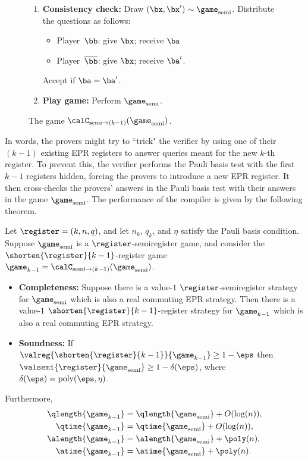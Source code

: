 {\begin{figure}
\begin{enumerate}
	\item \textbf{Consistency check:} Draw $(\bx, \bx') \sim \game_{\mathrm{semi}}$.
			Distribute the questions as follows:
				\begin{itemize}
				\item[$\circ$] Player~$\bb$: give $\bx$; receive $\ba$
				\item[$\circ$] Player~$\overline{\bb}$: give $\bx$; receive $\ba'$.
				\end{itemize}
				Accept if $\ba = \ba'$.
	\item \textbf{Play game:} Perform $\game_{\mathrm{semi}}$.
	\end{enumerate}
	\caption{The game $\calC_{\mathrm{semi} \rightarrow (k-1)}(\game_{\mathrm{semi}})$.\label{fig:one-to-zero}}
\end{figure}
}

In words, the provers might try to ``trick" the verifier by using one of their $(k-1)$ existing EPR registers to answer queries meant for the new $k$-th register.
To prevent this, the verifier performs the Pauli basis test with the first $k-1$ registers hidden, forcing the provers to introduce a new EPR register.
It then cross-checks the provers' answers in the Pauli basis test with their answers in the game $\game_{\mathrm{semi}}$.
The performance of the compiler is given by the following theorem.

\begin{theorem}\label{theorem:one-to-zero-compiler}
Let $\register = (k, n, q)$, and let $n_k$, $q_k$, and $\eta$ satisfy the Pauli basis condition.
Suppose $\game_{\mathrm{semi}}$ is a $\register$-semiregister game,
and consider the $\shorten{\register}{k-1}$-register game $\game_{k-1} = \calC_{\mathrm{semi} \rightarrow (k-1)}(\game_{\mathrm{semi}})$.
\begin{itemize}
\item[$\circ$] \textbf{Completeness:} Suppose there is a value-$1$ $\register$-semiregister strategy for $\game_{\mathrm{semi}}$ which is also a real commuting EPR strategy.
	Then there is a value-$1$ $\shorten{\register}{k-1}$-register strategy for $\game_{k-1}$ which is also a real commuting EPR strategy.
\item[$\circ$] \textbf{Soundness:} If $\valreg{\shorten{\register}{k-1}}{\game_{k-1}}\geq 1-\eps$ then $\valsemi{\register}{\game_{\mathrm{semi}}} \geq 1 -\delta(\eps)$, where $\delta(\eps) = \mathrm{poly}(\eps, \eta)$.
\end{itemize}
Furthermore,
\begin{align*}
\qlength{\game_{k-1}} &= \qlength{\game_{\mathrm{semi}}} + O(\log(n)),  \\
\qtime{\game_{k-1}} &= \qtime{\game_{\mathrm{semi}}} + O(\log(n)), \\
\alength{\game_{k-1}} &= \alength{\game_{\mathrm{semi}}} + \poly(n),\\
\atime{\game_{k-1}} &= \atime{\game_{\mathrm{semi}}} + \poly(n).
\end{align*}
\end{theorem}

